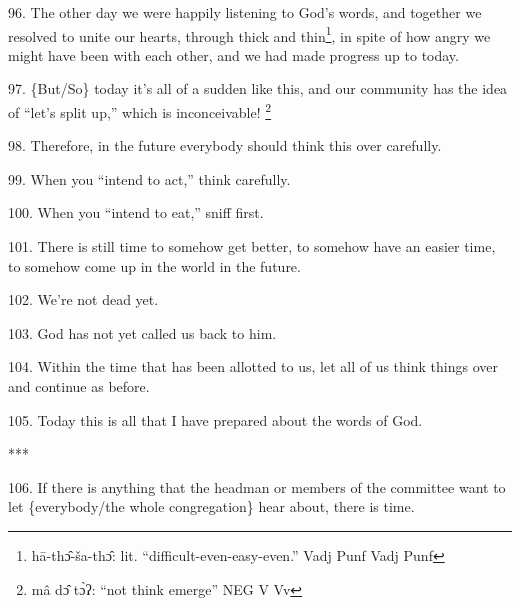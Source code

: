 96. The other day we were happily listening to God's words, and together we resolved
to unite our hearts, through thick and thin\footnote{hā-thɔ̂-ša-thɔ̂: lit. ``difficult-even-easy-even.''  Vadj Punf Vadj Punf}, in spite of how angry we might
have been with each other, and we had made progress up to today.

97. \{But/So\} today it's all of a sudden like this, and our community has the
idea of ``let's split up,'' which is inconceivable! \footnote{mâ dɔ̂ tɔ̀ʔ: ``not think emerge''  NEG V Vv}

98. Therefore, in the future everybody should think this over carefully.

99. When you ``intend to act,'' think carefully.

100. When you ``intend to eat,'' sniff first.

101. There is still time to somehow get better, to somehow have an easier time,
to somehow come up in the world in the future.

102. We're not dead yet.

103. God has not yet called us back to him.

104. Within the time that has been allotted to us, let all of us think things over
and continue as before.

105. Today this is all that I have prepared about the words of God.

***

106. If there is anything that the headman or members of the committee want to
let \{everybody/the whole congregation\} hear about, there is time.

